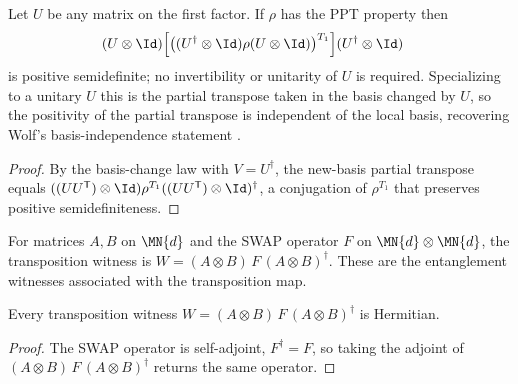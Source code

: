 \begin{theorem}
    \label{thm:is_ppt_basis_change}
    \leanok
    Let $U$ be any matrix on the first factor. If $\rho$ has the PPT property then
    \begin{align}
        &(U\otimes\Id)
        \Bigl[\bigl((U^\dagger\otimes\Id) \rho
        (U\otimes\Id)\bigr)^{T_1}\Bigr]
        (U^\dagger\otimes\Id)
        \notag
    \end{align}
    is positive semidefinite; no invertibility or unitarity of $U$ is required.
    Specializing to a unitary $U$ this is the partial transpose taken in the basis
    changed by $U$, so the positivity of the partial transpose is independent of the
    local basis, recovering Wolf's basis-independence statement
    \cite[Equation~(3.17)]{Wolf2012Quantum}.
\end{theorem}

\begin{proof}
    \leanok
    By the basis-change law with $V=U^\dagger$, the new-basis partial transpose
    equals $((U U^{\mathsf T})\otimes\Id) \rho^{T_1}
    ((U U^{\mathsf T})\otimes\Id)^\dagger$, a conjugation of $\rho^{T_1}$
    that preserves positive semidefiniteness.
\end{proof}

\begin{definition}
    \label{def:transposition_witness}
    \leanok
    For matrices $A,B$ on $\MN{d}$ and the SWAP operator $F$ on
    $\MN{d}\otimes\MN{d}$, the transposition witness is
    $W=(A\otimes B)\,F\,(A\otimes B)^\dagger$.
    These are the entanglement witnesses associated with the transposition map.
\end{definition}

\begin{theorem}
    \label{thm:transposition_witness_hermitian}
    \leanok
    Every transposition witness $W=(A\otimes B)\,F\,(A\otimes B)^\dagger$ is
    Hermitian.
\end{theorem}

\begin{proof}
    \leanok
    The SWAP operator is self-adjoint, $F^\dagger=F$, so taking the adjoint of
    $(A\otimes B)\,F\,(A\otimes B)^\dagger$ returns the same operator.
\end{proof}

